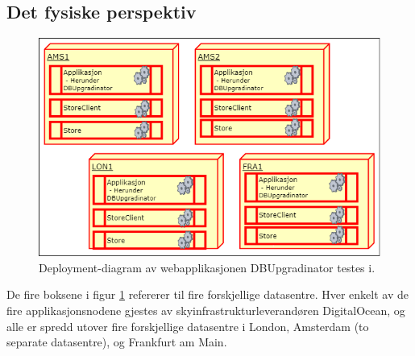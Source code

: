 \newpage

\subsection{Det fysiske perspektiv}

\begin{figure}[hbtp]
    \centering
    \includegraphics[scale=0.5]{fig/dbupgradinator-physical.png}
    \caption{Deployment-diagram av webapplikasjonen DBUpgradinator testes i.}
    \label{fig10}
\end{figure}

De fire boksene i figur \ref{fig10} refererer til fire forskjellige datasentre. Hver enkelt av de fire applikasjonsnodene gjestes av skyinfrastrukturleverandøren DigitalOcean, og alle er spredd utover fire forskjellige datasentre i London, Amsterdam (to separate datasentre), og Frankfurt am Main.

